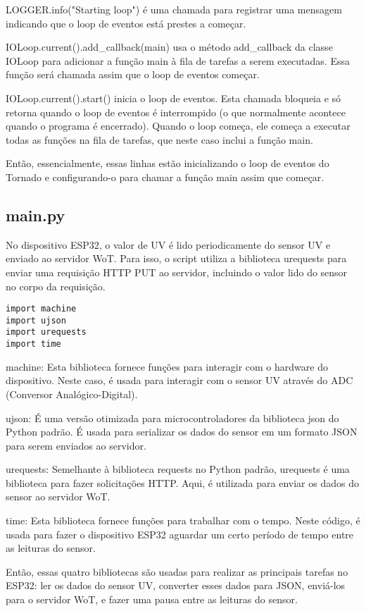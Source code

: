 LOGGER.info("Starting loop") é uma chamada para registrar uma mensagem indicando que o loop de eventos está prestes a começar.

IOLoop.current().add\_callback(main) usa o método add\_callback da classe IOLoop para adicionar a função main à fila de tarefas a serem executadas. Essa função será chamada assim que o loop de eventos começar.

IOLoop.current().start() inicia o loop de eventos. Esta chamada bloqueia e só retorna quando o loop de eventos é interrompido (o que normalmente acontece quando o programa é encerrado). Quando o loop começa, ele começa a executar todas as funções na fila de tarefas, que neste caso inclui a função main.

Então, essencialmente, essas linhas estão inicializando o loop de eventos do Tornado e configurando-o para chamar a função main assim que começar.

\subsection{main.py}

No dispositivo ESP32, o valor de UV é lido periodicamente do sensor UV e enviado ao servidor WoT. Para isso, o script utiliza a biblioteca urequests para enviar uma requisição HTTP PUT ao servidor, incluindo o valor lido do sensor no corpo da requisição.

\begin{verbatim}
import machine
import ujson
import urequests
import time
\end{verbatim}

machine: Esta biblioteca fornece funções para interagir com o hardware do dispositivo. Neste caso, é usada para interagir com o sensor UV através do ADC (Conversor Analógico-Digital).

ujson: É uma versão otimizada para microcontroladores da biblioteca json do Python padrão. É usada para serializar os dados do sensor em um formato JSON para serem enviados ao servidor.

urequests: Semelhante à biblioteca requests no Python padrão, urequests é uma biblioteca para fazer solicitações HTTP. Aqui, é utilizada para enviar os dados do sensor ao servidor WoT.

time: Esta biblioteca fornece funções para trabalhar com o tempo. Neste código, é usada para fazer o dispositivo ESP32 aguardar um certo período de tempo entre as leituras do sensor.

Então, essas quatro bibliotecas são usadas para realizar as principais tarefas no ESP32: ler os dados do sensor UV, converter esses dados para JSON, enviá-los para o servidor WoT, e fazer uma pausa entre as leituras do sensor.

